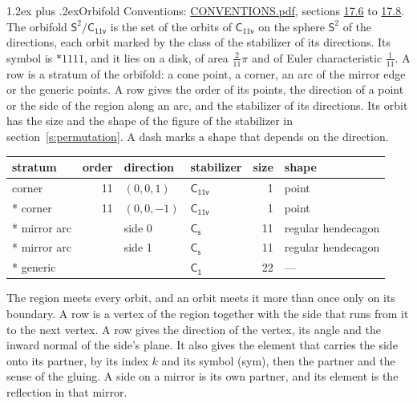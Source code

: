 \documentclass[10pt,a4paper]{article}
\makeatletter
\renewcommand\section{\@startsection{section}{1}{\z@}{-3ex plus -1ex minus -.2ex}%
  {1.2ex plus .2ex}{\normalfont\large\sffamily\bfseries\color{parttitle}}}
\numberwithin{equation}{section}
\newcommand{\grp}[1]{\mathsf{#1}}
\newcommand{\orbname}[1]{#1}
\newcommand{\dirvec}[3]{(#1, #2, #3)}
\newcommand{\twosphere}{\mathsf{S}^{2}}
\makeatother
\begin{document}
\section{Orbifold}\label{s:orbifold}
Conventions: \href{../../CONVENTIONS.pdf}{CONVENTIONS.pdf}, sections \href{../../CONVENTIONS.pdf\#conv.17.6}{17.6} to \href{../../CONVENTIONS.pdf\#conv.17.8}{17.8}.
The orbifold $\twosphere/\grp{C_{11v}}$ is the set of the orbits of $\grp{C_{11v}}$ on the sphere $\twosphere$ of the directions, each orbit marked by the class of the stabilizer of its directions. Its symbol is $\orbname{{\ast}1111}$, and it lies on a disk, of area $\tfrac{2}{11}\pi$ and of Euler characteristic $\tfrac{1}{11}$.
\leavevmode\label{n:head.stratum}\label{n:head.order.point}\label{n:head.direction}\label{n:head.stabilizer}\label{n:head.size.orbit}\label{n:head.shape}A row is a stratum of the orbifold: a cone point, a corner, an arc of the mirror edge or the generic points. A row gives the order of its points, the direction of a point or the side of the region along an arc, and the stabilizer of its directions. Its orbit has the size and the shape of the figure of the stabilizer in section~\ref{s:permutation}. A dash marks a shape that depends on the direction.
{\small\setlength{\tabcolsep}{4pt}\begin{longtable}{@{}lrllrl@{}}\toprule
stratum & order & direction & stabilizer & size & shape\\\midrule\endhead
\bottomrule\endfoot\endlastfoot
corner & 11 & $\dirvec{0}{0}{1}$ & \href{C11v.pdf}{$\grp{C_{11v}}$} & 1 & point\\*
corner & 11 & $\dirvec{0}{0}{-1}$ & \href{C11v.pdf}{$\grp{C_{11v}}$} & 1 & point\\*
mirror arc &  & side 0 & \href{C1v.pdf}{$\grp{C_{s}}$} & 11 & regular hendecagon\\*
mirror arc &  & side 1 & \href{C1v.pdf}{$\grp{C_{s}}$} & 11 & regular hendecagon\\*
generic &  &  & \href{C1.pdf}{$\grp{C_{1}}$} & 22 & ---\\
\bottomrule\end{longtable}}
\leavevmode\label{n:head.vertex.region}\label{n:head.angle}\label{n:head.normal.side}\label{n:head.partner}\label{n:head.sense}The region meets every orbit, and an orbit meets it more than once only on its boundary. A row is a vertex of the region together with the side that runs from it to the next vertex. A row gives the direction of the vertex, its angle and the inward normal of the side's plane. It also gives the element that carries the side onto its partner, by its index $k$ and its symbol (sym), then the partner and the sense of the gluing. A side on a mirror is its own partner, and its element is the reflection in that mirror.
\end{document}
